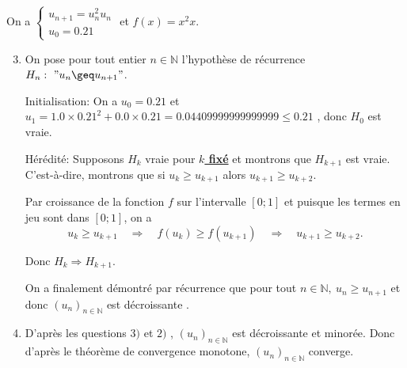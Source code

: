 \documentclass[15pt, mathserif]{beamer}
\begin{document}
\begin{frame}On a $\begin{cases} u_{n+1} = u_n^2u_n\\[1em] u_0 = 0.21\end{cases}$ et $f(x) = x^2x$.

\begin{enumerate}\setcounter{enumi}{2}

	\item On pose pour tout entier $n \in \mathbb{N}$ l'hypothèse de récurrence $H_n:~" u_n \geq u_{n+1}"$.

\medskip

Initialisation: On a $u_0 =0.21$ et $u_1 = 1.0\times0.21^2+0.0\times0.21 = 0.04409999999999999\leq 0.21$ , donc $H_0$ est vraie.

\medskip

Hérédité: Supposons $H_k$ vraie pour \textbf\underline{{$k$ fixé}} et montrons que $H_{k+1}$ est vraie. C'est-à-dire, montrons que si $u_k \geq  u_{k+1}$ alors $u_{k+1} \geq  u_{k+2}$.

 Par croissance de la fonction $f$ sur l'intervalle $[0;1]$ et puisque les termes en jeu sont dans $[0;1]$, on a \[ u_k \geq u_{k+1} \quad \Rightarrow \quad f(u_k) \geq  f(u_{k+1}) \quad \Rightarrow \quad  u_{k+1}\geq u_{k+2}. \]

Donc $H_{k} \Rightarrow H_{k+1}$.

 On a finalement démontré par récurrence que pour tout $n \in\mathbb{N},~ u_n \geq u_{n+1}$ et donc $(u_n)_{n\in\mathbb{N}}$ est décroissante .

\end{enumerate}
\end{frame}


\begin{frame}

\begin{enumerate}\setcounter{enumi}{3}

	\item D'après les questions $3)$ et $2)$ , $(u_n)_{n\in\mathbb{N}}$ est décroissante et minorée. Donc d'après le théorème de convergence monotone, $(u_n)_{n\in\mathbb{N}}$ converge.

\end{enumerate}\end{frame}
\end{document}
